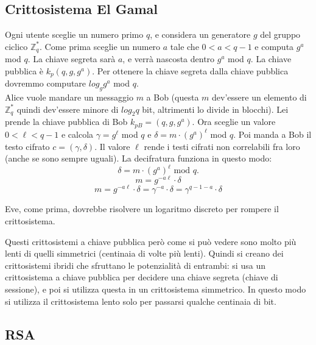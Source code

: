 \subsection*{Crittosistema El Gamal}

Ogni utente sceglie un numero primo $q$, e considera un generatore $g$ del gruppo ciclico $\mathbb{Z}_q^*$.
Come prima sceglie un numero $a$ tale che $0 < a < q-1$ e computa $g^a$ mod $q$. La chiave segreta sarà $a$, e verrà nascosta dentro $g^a$ mod $q$. La chiave pubblica è $k_p(q, g, g^a)$. Per ottenere la chiave segreta dalla chiave pubblica dovremmo computare $log_gg^a$ mod $q$.\\


Alice vuole mandare un messaggio $m$ a Bob (questa $m$ dev'essere un elemento di $\mathbb{Z}_q^*$ quindi dev'essere minore di $log_2q$ bit, altrimenti lo divide in blocchi).
Lei prende la chiave pubblica di Bob $k_{pB} = (q, g, g^a)$. Ora sceglie un valore $0 < \ell < q-1$ e calcola $\gamma = g^{\ell}$ mod $q$ e $\delta = m \cdot (g^a)^{\ell}$ mod $q$.
Poi manda a Bob il testo cifrato $c=(\gamma, \delta)$.
Il valore $\ell$ rende i testi cifrati non correlabili fra loro (anche se sono sempre uguali).
La decifratura funziona in questo modo:
\begin{equation*}
\delta = m \cdot (g^a)^{\ell} \text{ mod } q.
\end{equation*}
\begin{equation*}
m = g^{-a\ell} \cdot \delta
\end{equation*}
\begin{equation*}
	m = g^{-a\ell} \cdot \delta = \gamma^{-a} \cdot \delta = \gamma^{q-1-a} \cdot \delta
\end{equation*}

Eve, come prima, dovrebbe risolvere un logaritmo discreto per rompere il crittosistema.

Questi crittosistemi a chiave pubblica però come si può vedere sono molto più lenti di quelli simmetrici (centinaia di volte più lenti).
Quindi si creano dei crittosistemi ibridi che sfruttano le potenzialità di entrambi: si usa un crittosistema a chiave pubblica per decidere una chiave segreta (chiave di sessione), e poi si utilizza questa in un crittosistema simmetrico. In questo modo si utilizza il crittosistema lento solo per passarsi qualche centinaia di bit.

\subsection*{RSA}

